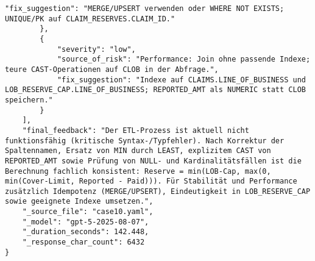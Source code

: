 \begin{lstlisting}[caption={Ausgabe: GPT-5 Anwendungsfall 10 Konsistenzdurchlauf},label={gpt_case10_prompt2}]
            "fix_suggestion": "MERGE/UPSERT verwenden oder WHERE NOT EXISTS; UNIQUE/PK auf CLAIM_RESERVES.CLAIM_ID."
        },
        {
            "severity": "low",
            "source_of_risk": "Performance: Join ohne passende Indexe; teure CAST-Operationen auf CLOB in der Abfrage.",
            "fix_suggestion": "Indexe auf CLAIMS.LINE_OF_BUSINESS und LOB_RESERVE_CAP.LINE_OF_BUSINESS; REPORTED_AMT als NUMERIC statt CLOB speichern."
        }
    ],
    "final_feedback": "Der ETL-Prozess ist aktuell nicht funktionsfähig (kritische Syntax-/Typfehler). Nach Korrektur der Spaltennamen, Ersatz von MIN durch LEAST, explizitem CAST von REPORTED_AMT sowie Prüfung von NULL- und Kardinalitätsfällen ist die Berechnung fachlich konsistent: Reserve = min(LOB-Cap, max(0, min(Cover-Limit, Reported - Paid))). Für Stabilität und Performance zusätzlich Idempotenz (MERGE/UPSERT), Eindeutigkeit in LOB_RESERVE_CAP sowie geeignete Indexe umsetzen.",
    "_source_file": "case10.yaml",
    "_model": "gpt-5-2025-08-07",
    "_duration_seconds": 142.448,
    "_response_char_count": 6432
}
\end{lstlisting}

